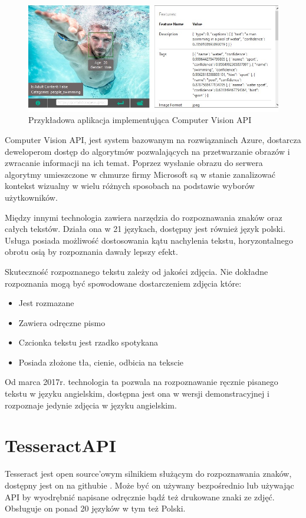 \documentclass[brudnopis]{xmgr}
\begin{document}
\begin{figure}[!tbh]
\centering
\includegraphics[width=.8\hsize]{fig/mscvapi}
\caption{Przykładowa aplikacja implementująca Computer Vision API}
\end{figure}
\newpage

Computer Vision API, jest system bazowanym na rozwiązaniach Azure, dostarcza deweloperom dostęp do algorytmów pozwalających na przetwarzanie obrazów i zwracanie informacji na ich temat. Poprzez wysłanie obrazu do serwera algorytmy umieszczone w chmurze firmy Microsoft są w stanie zanalizować kontekst wizualny w wielu różnych sposobach na podstawie wyborów użytkowników.

Między innymi technologia zawiera narzędzia do rozpoznawania znaków oraz całych tekstów. Działa ona w 21 językach, dostępny jest również język polski. Usługa posiada możliwość dostosowania kątu nachylenia tekstu, horyzontalnego obrotu osią by rozpoznania dawały lepszy efekt. 

Skuteczność rozpoznanego tekstu zależy od jakości zdjęcia. Nie dokładne rozpoznania mogą być spowodowane dostarczeniem zdjęcia które:

\begin{itemize}
\item
Jest rozmazane
\item
Zawiera odręczne pismo
\item
Czcionka tekstu jest rzadko spotykana
\item
Posiada złożone tła, cienie, odbicia na tekscie
\end{itemize}

Od marca 2017r. technologia ta pozwala na rozpoznawanie ręcznie pisanego tekstu w języku angielskim, dostępna jest ona w wersji demonstracyjnej i rozpoznaje jedynie zdjęcia w języku angielskim.

\section{TesseractAPI}

Tesseract jest open source'owym silnikiem służącym do rozpoznawania znaków, dostępny jest on na githubie\cite{1} . Może być on używany bezpośrednio lub używając API by wyodrębnić napisane odręcznie bądź też drukowane znaki ze zdjęć. Obsługuje on ponad 20 języków w tym też Polski.
\end{document}
